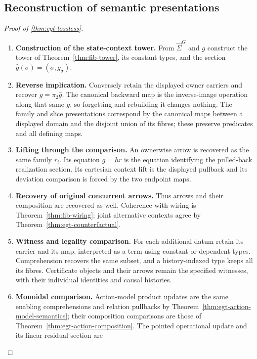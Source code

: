 \documentclass[11pt,a4paper]{article}
\numberwithin{equation}{section}
\theoremstyle{definition}
\theoremstyle{remark}
\theoremstyle{plain}
\begin{document}
\subsection{Reconstruction of semantic presentations}

\begin{proof}[Proof of \cref{thm:cgt-lossless}]
\leavevmode
\begin{enumerate}[label=\textup{(\arabic*)},leftmargin=*,itemsep=4pt,topsep=3pt]
  \item \textbf{Construction of the state-context tower.} From $\vec\Sigma^G$ and $g$ construct the tower of
Theorem~\ref{thm:fib-tower}, its constant types, and the section
$\widehat g(\sigma)=(\sigma,g_\sigma)$.
  \item \textbf{Reverse implication.} Conversely retain the
displayed owner carriers and recover $g=\pi_2\widehat g$. The canonical backward map is the inverse-image operation along that
same $g$, so forgetting and rebuilding it changes nothing. The family and slice presentations correspond by the canonical maps
between a displayed domain and the disjoint union of its fibres;
these preserve predicates and all defining maps.
  \item \textbf{Lifting through the comparison.} An ownerwise arrow is recovered as the same family $r_i$. Its equation
$g=h\bar r$ is the equation identifying the pulled-back realization
section. Its cartesian context lift is the displayed pullback and its
deviation comparison is forced by the two endpoint maps.
  \item \textbf{Recovery of original concurrent arrows.} Thus arrows
and their composition are recovered as well. Coherence with wiring is
Theorem~\ref{thm:fib-wiring}; joint alternative contexts agree by
Theorem~\ref{thm:egt-counterfactual}.
  \item \textbf{Witness and legality comparison.} For each additional datum retain its carrier and its map, interpreted
as a term using constant or dependent types. Comprehension recovers
the same subset, and a history-indexed type keeps all its fibres. Certificate objects and their arrows remain the specified witnesses,
with their individual identities and causal histories.
  \item \textbf{Monoidal comparison.} Action-model product updates
are the same enabling comprehensions and relation pullbacks by
Theorem~\ref{thm:egt-action-model-semantics}; their composition
comparisons are those of Theorem~\ref{thm:egt-action-composition}. The pointed operational update and its linear residual section are

\end{enumerate}
\end{proof}
\end{document}
